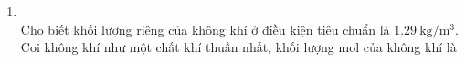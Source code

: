 \begin{enumerate}[label=\bfseries Câu \arabic*:, leftmargin=1.7cm]
\item {}\\
Cho biết khối lượng riêng của không khí ở điều kiện tiêu chuẩn là $\SI{1.29}{\kilogram/\meter^3}$. Coi không khí như một chất khí thuần nhất, khối lượng mol của không khí là
\end{enumerate}

